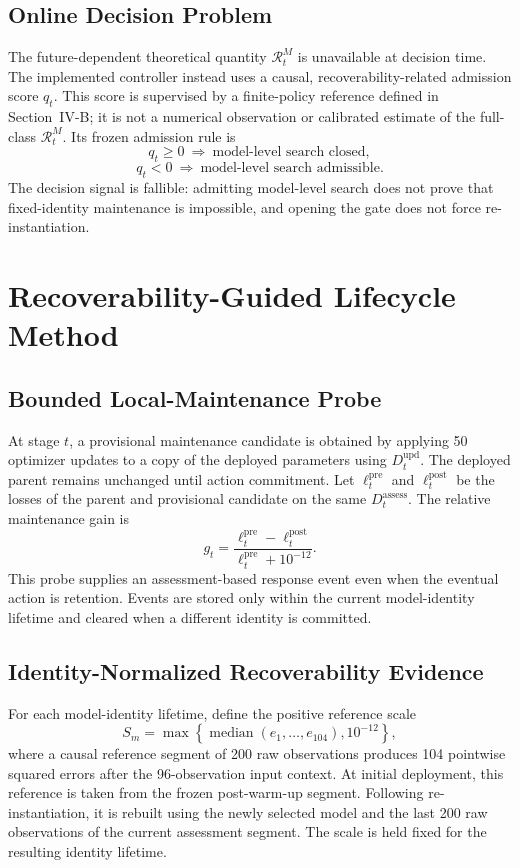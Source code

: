 \documentclass[journal]{IEEEtran}
\begin{document}
\subsection{Online Decision Problem}
The future-dependent theoretical quantity $\mathcal R_t^M$ is
unavailable at decision time. The implemented controller instead
uses a causal, recoverability-related admission score $q_t$.
This score is supervised by a finite-policy reference defined
in Section~IV-B; it is not a numerical observation or calibrated
estimate of the full-class $\mathcal R_t^M$. Its frozen
admission rule is
\begin{equation}
q_t\geq0\ \Rightarrow\ \text{model-level search closed},
\end{equation}
\begin{equation}
q_t<0\ \Rightarrow\ \text{model-level search admissible}.
\end{equation}
The decision signal is fallible: admitting model-level search
does not prove that fixed-identity maintenance is impossible,
and opening the gate does not force re-instantiation.

\section{Recoverability-Guided Lifecycle Method}
\subsection{Bounded Local-Maintenance Probe}
At stage $t$, a provisional maintenance candidate is obtained
by applying 50 optimizer updates to a copy of the deployed
parameters using $D_t^{\mathrm{upd}}$. The deployed parent remains
unchanged until action commitment. Let $\ell_t^{\mathrm{pre}}$
and $\ell_t^{\mathrm{post}}$ be the losses of the parent and
provisional candidate on the same $D_t^{\mathrm{assess}}$.
The relative maintenance gain is
\begin{equation}
g_t=\frac{\ell_t^{\mathrm{pre}}-\ell_t^{\mathrm{post}}}
{\ell_t^{\mathrm{pre}}+10^{-12}}.
\end{equation}
This probe supplies an assessment-based response event even when
the eventual action is retention. Events are stored only within
the current model-identity lifetime and cleared when a different
identity is committed.

\subsection{Identity-Normalized Recoverability Evidence}
For each model-identity lifetime, define the positive reference scale
\begin{equation}
S_m=\max\!\left\{\operatorname{median}(e_1,\ldots,e_{104}),
10^{-12}\right\},
\end{equation}
where a causal reference segment of 200 raw observations produces
104 pointwise squared errors after the 96-observation input context.
At initial deployment, this reference is taken from the frozen
post-warm-up segment. Following re-instantiation, it is rebuilt
using the newly selected model and the last 200 raw observations
of the current assessment segment. The scale is held fixed for
the resulting identity lifetime.
\end{document}
